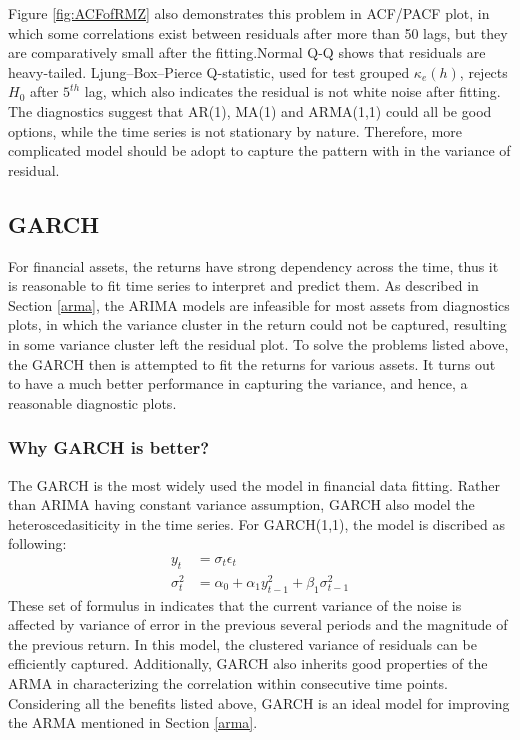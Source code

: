 \documentclass[11pt]{article}
\begin{document}
Figure \ref{fig:ACFofRMZ} also demonstrates this problem in ACF/PACF plot, in which some correlations exist between residuals after more than 50 lags, but they are comparatively small after the fitting.Normal Q-Q shows that residuals are heavy-tailed. Ljung–Box–Pierce Q-statistic, used for test grouped $\kappa_e(h)$, rejects $H_0$ after $5^{th}$ lag, which also indicates the residual is not white noise after fitting. The diagnostics suggest that AR(1), MA(1) and ARMA(1,1) could all be good options, while the time series is not stationary by nature. Therefore, more complicated model should be adopt to capture the pattern with in the variance of residual.



\subsection{GARCH} \label{garch}
For financial assets, the returns have strong dependency across the time, thus it is reasonable to fit time series to interpret and predict them. As described in Section \ref{arma}, the ARIMA models are infeasible for most assets from diagnostics plots, in which the variance cluster in the return could not be captured, resulting in some variance cluster left the residual plot. To solve the problems listed above, the GARCH then is attempted to fit the returns for various assets. It turns out to have a much better performance in capturing the variance, and hence, a reasonable diagnostic plots.
\subsubsection{Why GARCH is better?}
The GARCH is the most widely used the model in financial data fitting. Rather than ARIMA having constant variance assumption, GARCH also model the heteroscedasiticity in the time series.  For GARCH(1,1), the model is discribed as following:
\begin{align*} 
y_t & = \sigma_t \epsilon_t\\
\sigma_t^2 & = \alpha_0+ \alpha_1 y_{t-1}^2 +\beta_1\sigma_{t-1}^2
\end{align*}
These set of formulus in indicates that the current variance of the noise is affected by variance of error in the previous several periods and the magnitude of the previous return. In this model, the clustered variance of residuals can be efficiently captured. Additionally, GARCH also inherits good properties of the ARMA in characterizing the correlation within consecutive time points. Considering all the benefits listed above, GARCH is an ideal model for improving the ARMA mentioned in Section \ref{arma}.
\end{document}
